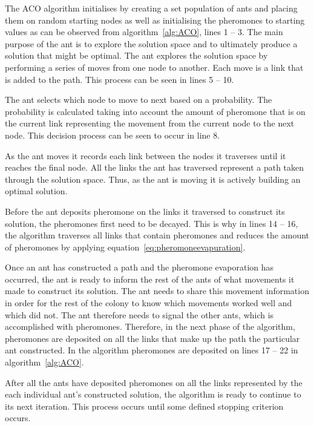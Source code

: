 The ACO algorithm initialises by creating a set population of ants and placing them on random starting nodes as well as initialising the pheromones to starting values as can be observed from algorithm~\ref{alg:ACO}, lines 1 -- 3. The main purpose of the ant is to explore the solution space and to ultimately produce a solution that might be optimal. The ant explores the solution space by performing a series of moves from one node to another. Each move is a link that is added to the path. This process can be seen in lines 5 -- 10.

The ant selects which node to move to next based on a probability. The probability is calculated taking into account the amount of pheromone that is on the current link representing the movement from the current node to the next node\cite{CompuIntelligenceIntro,FundamentalSwarm}. This decision process can be seen to occur in line 8.

As the ant moves it records each link between the nodes it traverses until it reaches the final node. All the links the ant has traversed represent a path taken through the solution space\cite{CompuIntelligenceIntro,FundamentalSwarm}. Thus, as the ant is moving it is actively building an optimal solution.

Before the ant deposits pheromone on the links it traversed to construct its solution, the pheromones first need to be decayed. This is why in lines 14 -- 16, the algorithm traverses all links that contain pheromones and reduces the amount of pheromones by applying equation~\ref{eq:pheromoneevapuration}.

Once an ant has constructed a path and the pheromone evaporation has occurred, the ant is ready to inform the rest of the ants of what movements it made to construct its solution. The ant needs to share this movement information in order for the rest of the colony to know which movements worked well and which did not. The ant therefore needs to signal the other ants, which is accomplished with pheromones. Therefore, in the next phase of the algorithm, pheromones are deposited on all the links that make up the path the particular ant constructed. In the algorithm pheromones are deposited on lines 17 -- 22 in algorithm~\ref{alg:ACO}.

After all the ants have deposited pheromones on all the links represented by the each individual ant's constructed solution, the algorithm is ready to continue to its next iteration. This process occurs until some defined stopping criterion occurs.


